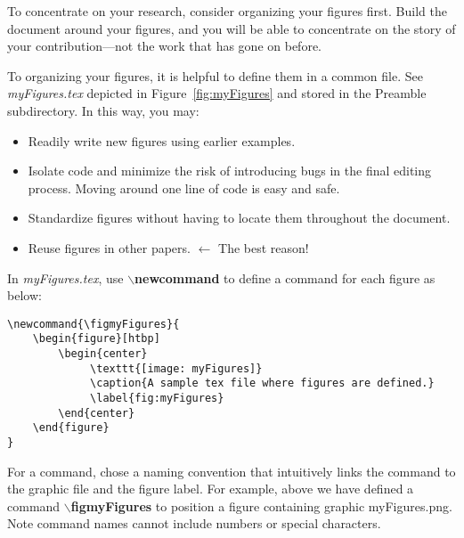 
To concentrate on your research, consider organizing your figures
first.  Build the document around your figures, and you will be able
to concentrate on the story of your contribution---not the work that
has gone on before.  

To organizing your figures, it is helpful to define them in a
common file.  See {\em myFigures.tex} depicted in
Figure~\ref{fig:myFigures} and stored in the Preamble subdirectory.
In this way, you may:
    \begin{itemize}
      \item Readily write new figures using earlier examples. 
      
      \item  Isolate code and minimize the risk of introducing bugs in the
      final editing process.  Moving around one line of
      code is easy and safe.
      
      \item Standardize figures without having to locate them 
      throughout the document.
      
      \item  Reuse figures in other papers.  $\leftarrow$ The best reason!
    \end{itemize}
        
\noindent In {\em myFigures.tex}, use {\bf
$\backslash${newcommand}} to define a command for each figure as
below:

{\vspace{-.30in}}
{\singlespace
\begin{verbatim}
\newcommand{\figmyFigures}{
    \begin{figure}[htbp]
        \begin{center}
             \texttt{[image: myFigures]}
             \caption{A sample tex file where figures are defined.}
             \label{fig:myFigures}
        \end{center}
    \end{figure}
}
\end{verbatim}}
    
\noindent For a command, chose a naming convention that
intuitively links the command to the graphic file and the figure
label.  For example, above we have defined a command {\bf
$\backslash${figmyFigures}} to position a figure containing graphic
myFigures.png.  Note command names cannot include numbers or special
characters.


